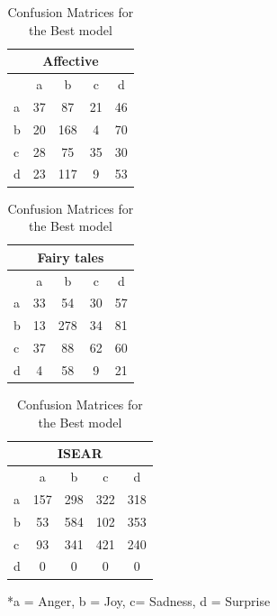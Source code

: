 \documentclass[
10pt, %
a4paper, %
oneside, %
headinclude,footinclude, %
BCOR5mm, %
]{scrartcl}
\begin{document}
\begin{table}[hbt]
            \footnotesize
                \begin{tabular}[t]{|l|c|c|c|c|}
                    \hline
                    \multicolumn{5}{|c|}{{Affective}} \\    
                    \hline
                    &a&b&c&d\\ \hline
                    a&37&87&21&46 \\ \hline
                    b&20&168&4&70\\ \hline
                    c&28&75&35&30 \\ \hline   
                    d&23&117&9&53\\ \hline
                \end{tabular}
                \hfill
                \begin{tabular}[t]{|l|c|c|c|c|}
                    \hline
                    \multicolumn{5}{|c|}{{Fairy tales}} \\    
                    \hline
                    &a&b&c&d\\ \hline
                    a&33&54&30&57 \\ \hline
                    b&13&278&34&81\\ \hline
                    c&37&88&62&60 \\ \hline   
                    d&4&58&9&21\\ \hline
                \end{tabular}
                \hfill
                \begin{tabular}[t]{|l|c|c|c|c|}
                    \hline
                    \multicolumn{5}{|c|}{{ISEAR}} \\    
                    \hline
                    &a&b&c&d\\ \hline
                    a&157&298&322&318 \\ \hline
                    b&53&584&102&353\\ \hline
                    c&93&341&421&240 \\ \hline   
                    d&0&0&0&0\\ \hline
                \end{tabular}
                \caption{Confusion Matrices for the Best model}
                \label{Confusion Matrices for the Best model}
                *a = Anger, b = Joy, c= Sadness, d = Surprise
            \end{table}
\end{document}
